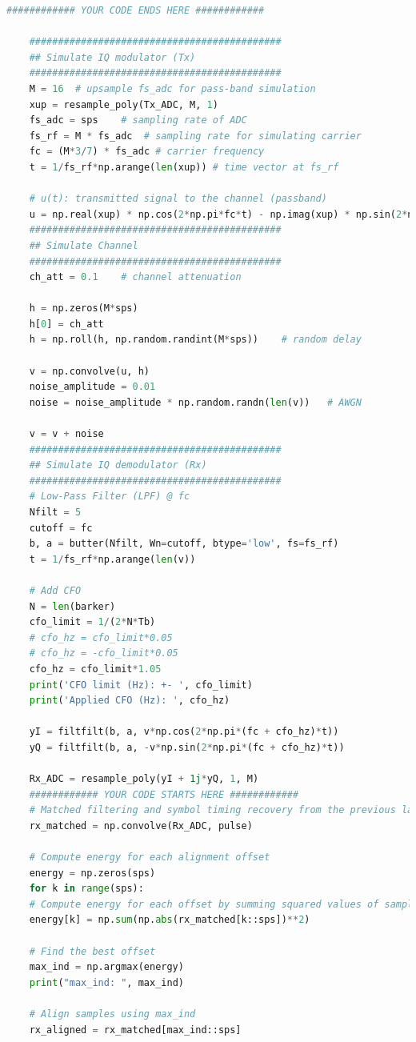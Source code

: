 \documentclass[
	letterpaper, %
	10pt, %
]{CSUniSchoolLabReport}
\begin{document}
\begin{lstlisting}[language=Python]
	############ YOUR CODE ENDS HERE ############  
	
	############################################
	## Simulate IQ modulator (Tx)
	############################################
	M = 16  # upsample fs_adc for pass-band simulation
	xup = resample_poly(Tx_ADC, M, 1)
	fs_adc = sps    # sampling rate of ADC
	fs_rf = M * fs_adc  # sampling rate for simulating carrier
	fc = (M*3/7) * fs_adc # carrier frequency
	t = 1/fs_rf*np.arange(len(xup)) # time vector at fs_rf
	
	# u(t): transmitted signal to the channel (passband)
	u = np.real(xup) * np.cos(2*np.pi*fc*t) - np.imag(xup) * np.sin(2*np.pi*fc*t)
	############################################
	## Simulate Channel
	############################################
	ch_att = 0.1    # channel attenuation
	
	h = np.zeros(M*sps)
	h[0] = ch_att
	h = np.roll(h, np.random.randint(M*sps))    # random delay
	
	v = np.convolve(u, h) 
	noise_amplitude = 0.01
	noise = noise_amplitude * np.random.randn(len(v))   # AWGN
	
	v = v + noise
	############################################
	## Simulate IQ demodulator (Rx)
	############################################
	# Low-Pass Filter (LPF) @ fc
	Nfilt = 5
	cutoff = fc
	b, a = butter(Nfilt, Wn=cutoff, btype='low', fs=fs_rf)
	t = 1/fs_rf*np.arange(len(v))
	
	# Add CFO
	N = len(barker)
	cfo_limit = 1/(2*N*Tb)
	# cfo_hz = cfo_limit*0.05
	# cfo_hz = -cfo_limit*0.05
	cfo_hz = cfo_limit*1.05
	print('CFO limit (Hz): +- ', cfo_limit)
	print('Applied CFO (Hz): ', cfo_hz)
	
	yI = filtfilt(b, a, v*np.cos(2*np.pi*(fc + cfo_hz)*t))
	yQ = filtfilt(b, a, -v*np.sin(2*np.pi*(fc + cfo_hz)*t))
	
	Rx_ADC = resample_poly(yI + 1j*yQ, 1, M)
	############ YOUR CODE STARTS HERE ############
	# Matched filtering and symbol timing recovery from the previous labs here
	rx_matched = np.convolve(Rx_ADC, pulse)
	
	# Compute energy for each alignment offset
	energy = np.zeros(sps)
	for k in range(sps):
	# Compute energy for each offset by summing squared values of sampled segments
	energy[k] = np.sum(np.abs(rx_matched[k::sps])**2)
	
	# Find the best offset
	max_ind = np.argmax(energy)
	print("max_ind: ", max_ind)
	
	# Align samples using max_ind
	rx_aligned = rx_matched[max_ind::sps]
	

\end{lstlisting}
\end{document}
